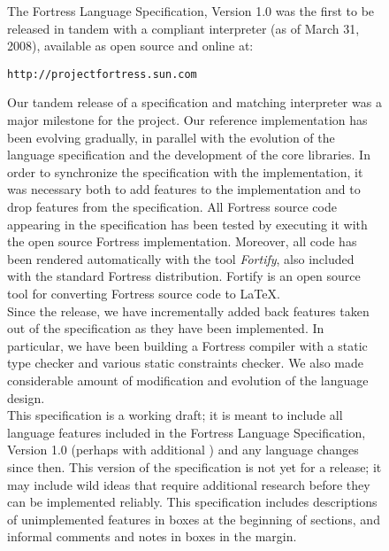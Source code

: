 %
%
%
%

\begin{figure}[p]
The Fortress Language Specification, Version 1.0\cite{Fortress} was the first to be
released in tandem with a compliant interpreter (as of March 31, 2008),
available as open source and online at:\\

\begin{center}
{\tt http://projectfortress.sun.com}\\[1em]
\end{center}
Our tandem release of a specification and matching interpreter was a major
milestone for the project.
Our reference implementation has been evolving gradually,
in parallel with the evolution of the language specification and
the development of the core libraries.  In order to synchronize
the specification with the implementation, it was necessary both to add
features to the implementation and to drop features from the specification.
All Fortress source code appearing in the specification has been
tested by executing it with the open source Fortress implementation. Moreover,
all code has been rendered automatically with the tool \emph{Fortify}, also
included with the standard Fortress distribution. Fortify is an open source tool
for converting Fortress source code to \LaTeX.\\


Since the release, we have incrementally added back
features taken out of the specification as they have been implemented.
In particular, we have been building a Fortress compiler with a static
type checker and various static constraints checker.
We also made considerable amount of modification and evolution of the
language design.\\


This specification is a working draft;
it is meant to include all language features included in
the Fortress Language Specification, Version 1.0\EXP{\beta{}}
(perhaps with additional ) and any language changes since then.
This version of the specification is not yet for a release;
it may include wild ideas that require additional research before they can be
implemented reliably.
This specification includes descriptions of unimplemented features in boxes
at the beginning of sections,
and informal comments and notes in boxes in the margin.
\end{figure}


